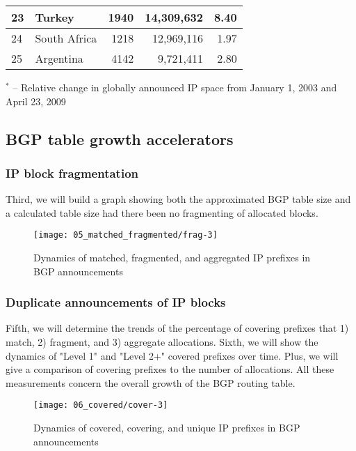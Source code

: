 \begin{table}[p]
\begin{center}
\begin{tabular}{|l||l|r|r|r|}
23      &       Turkey  		&       1940    &       14,309,632      & 8.40			\tabularnewline \hline
24      &       South Africa    &       1218    &       12,969,116      & 1.97			\tabularnewline \hline
25      &       Argentina       &       4142    &       9,721,411       & 2.80			\tabularnewline \hline
	\end{tabular}
	\end{center}
	\small	$^{*}$ -- Relative change in globally announced IP space from January 1, 2003 and April 23, 2009
\end{table}

\clearpage


\subsection{BGP table growth accelerators}

\subsubsection{IP block fragmentation}
Third, we will build a graph showing both the approximated BGP table size and a calculated table size had there been no fragmenting of allocated blocks.

\begin{figure}[htbp]
	\centering
		\texttt{[image: 05\_matched\_fragmented/frag-3]}
	\caption{Dynamics of matched, fragmented, and aggregated IP prefixes in BGP announcements}
	\label{fig:fragmentation}
\end{figure}

\subsubsection{Duplicate announcements of IP blocks}
Fifth, we will determine the trends of the percentage of covering prefixes that 1) match, 2) fragment, and 3) aggregate allocations.
Sixth, we will show the dynamics of "Level 1" and "Level 2+" covered prefixes over time. Plus, we will give a comparison of covering prefixes to the number of allocations.  All these measurements concern the overall growth of the BGP routing table.

\begin{figure}[htbp]
	\centering
		\texttt{[image: 06\_covered/cover-3]}
	\caption{Dynamics of covered, covering, and unique IP prefixes in BGP announcements}
	\label{fig:label}
\end{figure}
